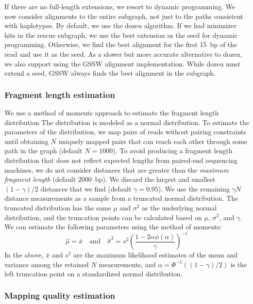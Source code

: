 \documentclass[11pt]{ucscthesis}
\newcommand{\param}[1]{\emph{#1}}
\begin{document}
If there are no full-length extensions, we resort to dynamic programming.
We now consider alignments to the entire subgraph, not just to the paths consistent with haplotypes.
By default, we use the dozeu algorithm.
If we had minimizer hits in the rescue subgraph, we use the best extension as the seed for dynamic programming.
Otherwise, we find the best alignment for the first 15~bp of the read and use it as the seed.
As a slower but more accurate alternative to dozeu, we also support using the GSSW alignment implementation\cite{zhao_gssw_2013}.
While dozeu must extend a seed, GSSW always finds the best alignment in the subgraph.


\subsubsection{Fragment length estimation}
\label{subsec:aim2:fragment-length}

We use a method of moments approach to estimate the fragment length distribution
The distribution is modeled as a normal distribution.
To estimate the parameters of the distribution, we map pairs of reads without pairing constraints until obtaining $N$ uniquely mapped pairs that can reach each other through some path in the graph (default $N = 1000$).
To avoid producing a fragment length distribution that does not reflect expected lengths from paired-end sequencing machines, we do not consider distances that are greater than the \param{maximum fragment length} (default $2000$~bp).
We discard the largest and smallest $(1 - \gamma) / 2$ distances that we find (default $\gamma = 0.95$).
We use the remaining $\gamma N$ distance measurements as a sample from a truncated normal distribution.
The truncated distribution has the same $\mu$ and $\sigma^{2}$ as the underlying normal distribution, and the truncation points can be calculated based on $\mu$, $\sigma^{2}$, and $\gamma$.
We can estimate the following parameters using the method of moments:
$$
\hat{\mu} = \bar{x} \quad \textrm{and} \quad
\hat{\sigma}^{2} = s^{2} \left( \frac{1 - 2 \alpha \phi(\alpha)}{\gamma} \right)^{-1}
$$
In the above, $\bar{x}$ and $s^{2}$ are the maximum likelihood estimates of the mean and variance among the retained $N$ measurements, and $\alpha = \Phi^{-1}((1 - \gamma) / 2)$ is the left truncation point on a standardized normal distribution.


\subsubsection{Mapping quality estimation}
\end{document}
